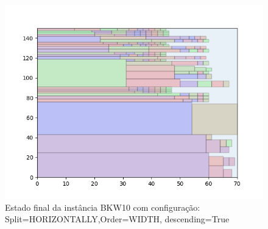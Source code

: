 \begin{figure}[H]
    \centering
    \caption[]{Estado final da instância BKW10 com configuração: Split=HORIZONTALLY,Order=WIDTH, descending=True}
    \label{fig:bkw10-horizontally-width-true}
    \includegraphics[scale=0.5]{output/figures/bkw/bkw10/horizontally/width/true/000}
\end{figure}
